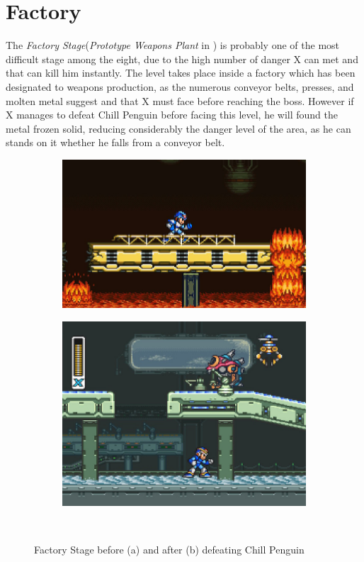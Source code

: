 \section{Factory} 
The \textit{Factory Stage}(\textit{Prototype Weapons Plant} in \mhx)  is probably one of the most difficult stage among the eight, due to the high number of danger X can met and that can kill him instantly. The level takes place inside a factory which has been designated to weapons production, as the numerous conveyor belts, presses, and molten metal suggest and that X must face before reaching the boss. However if X manages to defeat Chill Penguin before facing this level, he will found the metal frozen solid, reducing considerably the danger level of the area, as he can stands on it whether he falls from a conveyor belt.
\begin{figure}[h]
	\centering
	\begin{subfigure}{0.49\textwidth}
		\centering
		\includegraphics[width=\linewidth]{figures/X1/Flame_fire.jpg}
		\caption{}
	\end{subfigure}
	\begin{subfigure}{0.49\textwidth}
		\centering
		\includegraphics[width=\linewidth]{figures/X1/Flame_frozen.jpg}
		\caption{}
	\end{subfigure}\\
	\caption{Factory Stage before (a) and after (b)  defeating Chill Penguin}
\end{figure}


